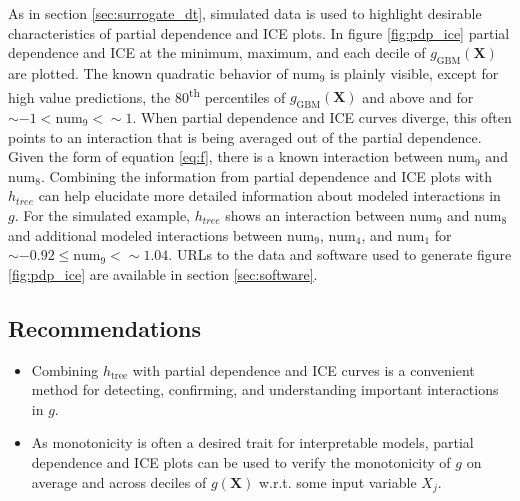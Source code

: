 \documentclass{article}
\begin{document}
As in section \ref{sec:surrogate_dt}, simulated data is used to highlight desirable characteristics of partial dependence and ICE plots. In figure \ref{fig:pdp_ice} partial dependence and ICE at the minimum, maximum, and each decile of $g_{\text{GBM}}(\mathbf{X})$ are plotted. The known quadratic behavior of $\text{num}_9$ is plainly visible, except for high value predictions, the 80\textsuperscript{th} percentiles of $g_{\text{GBM}}(\mathbf{X})$ and above and for $\sim-1 < \text{num}_9 < \sim1$. When partial dependence and ICE curves diverge, this often points to an interaction that is being averaged out of the partial dependence. Given the form of equation \ref{eq:f}, there is a known interaction between $\text{num}_9$ and $\text{num}_8$. Combining the information from partial dependence and ICE plots with $h_{tree}$ can help elucidate more detailed information about modeled interactions in $g$. For the simulated example, $h_{tree}$ shows an interaction between $\text{num}_9$ and $\text{num}_8$ and additional modeled interactions between $\text{num}_9$, $\text{num}_4$, and $\text{num}_1$ for $\sim -0.92 \le \text{num}_9 <  \sim 1.04.$ URLs to the data and software used to generate figure \ref{fig:pdp_ice} are available in section \ref{sec:software}.

\subsection{Recommendations}

\begin{itemize}

\item Combining $h_{\text{tree}}$ with partial dependence and ICE curves is a convenient method for detecting, confirming, and understanding important interactions in $g$.

\item As monotonicity is often a desired trait for interpretable models, partial dependence and ICE plots can be used to verify the monotonicity of $g$ on average and across deciles of $g(\mathbf{X})$ w.r.t. some input variable $X_j$.

\end{itemize}




\end{document}
